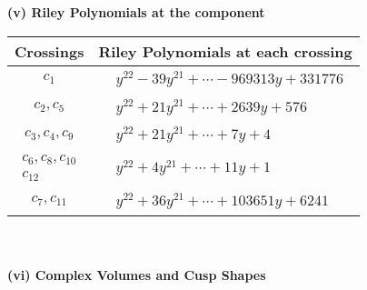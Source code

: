 \documentclass[1p]{elsarticle_modified}
\theoremstyle{definition}
\begin{document}
\newpage\renewcommand{\arraystretch}{1}
\flushleft \textbf{(v) Riley Polynomials at the component}\newline \\
\begin{tabular}{m{50pt}|m{274pt}}
Crossings & \hspace{64pt}Riley Polynomials at each crossing \\
\hline $$\begin{aligned}c_{1}\end{aligned}$$&$\begin{aligned}
&y^{22}-39 y^{21}+\cdots-969313 y+331776
\end{aligned}$\\
\hline $$\begin{aligned}c_{2},c_{5}\end{aligned}$$&$\begin{aligned}
&y^{22}+21 y^{21}+\cdots+2639 y+576
\end{aligned}$\\
\hline $$\begin{aligned}c_{3},c_{4},c_{9}\end{aligned}$$&$\begin{aligned}
&y^{22}+21 y^{21}+\cdots+7 y+4
\end{aligned}$\\
\hline $$\begin{aligned}c_{6},c_{8},c_{10}\\c_{12}\end{aligned}$$&$\begin{aligned}
&y^{22}+4 y^{21}+\cdots+11 y+1
\end{aligned}$\\
\hline $$\begin{aligned}c_{7},c_{11}\end{aligned}$$&$\begin{aligned}
&y^{22}+36 y^{21}+\cdots+103651 y+6241
\end{aligned}$\\
\hline
\end{tabular}\\~\\
\newpage\flushleft \textbf{(vi) Complex Volumes and Cusp Shapes}
\end{document}
